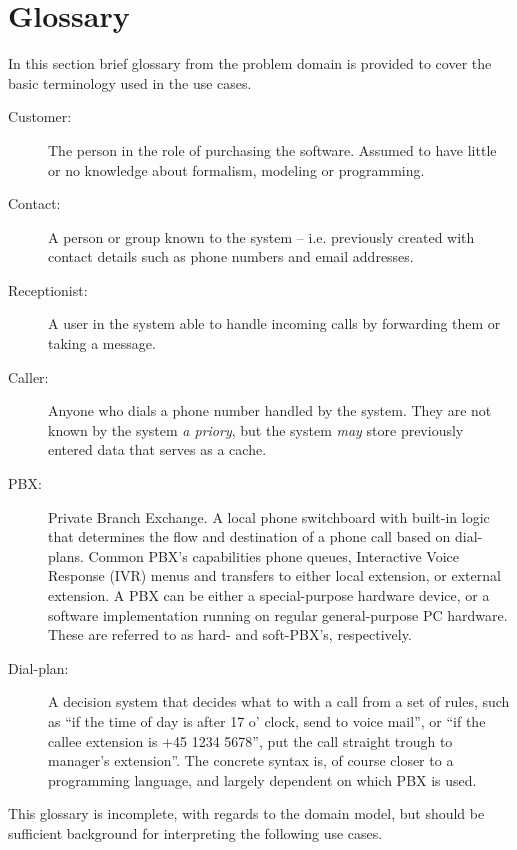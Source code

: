 \documentclass[10pt]{scrreprt}
\begin{document}
\section{Glossary}
In this section brief glossary from the problem domain is provided to cover the basic terminology used in the use cases.
\begin{description}
  \item[Customer:] The person in the role of purchasing the software. Assumed to have little or no knowledge about formalism, modeling or programming.
  \item[Contact:] A person or group known to the system -- i.e. previously created with contact details such as phone numbers and email addresses.
  \item[Receptionist:] A user in the system able to handle incoming calls by forwarding them or taking a message.
  \item[Caller:] Anyone who dials a phone number handled by the system. They are not known by the system \textit{a priory}, but the system \textit{may} store previously entered data that serves as a cache.
  \item[PBX:] Private Branch Exchange. A local phone switchboard with built-in logic that determines the flow and destination of a phone call based on dial-plans. Common PBX's capabilities phone queues, Interactive Voice Response (IVR) menus and transfers to either local extension, or external extension. A PBX can be either a special-purpose hardware device, or a software implementation running on regular general-purpose PC hardware. These are referred to as hard- and soft-PBX's, respectively.
  \item[Dial-plan:] A decision system that decides what to with a call from a set of rules, such as ``if the time of day is after 17 o' clock, send to voice mail'', or ``if the callee extension is +45 1234 5678'', put the call straight trough to manager's extension''. The concrete syntax is, of course closer to a programming language, and largely dependent on which PBX is used.
\end{description}
This glossary is incomplete, with regards to the domain model, but should be sufficient background for interpreting the following use cases.
\end{document}

